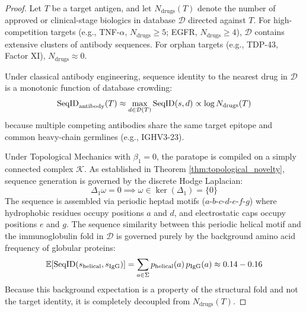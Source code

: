 \begin{proof}
Let $T$ be a target antigen, and let $N_{\text{drugs}}(T)$ denote the number of approved or clinical-stage biologics in database $\mathcal{D}$ directed against $T$. For high-competition targets (e.g., TNF-$\alpha$, $N_{\text{drugs}} \ge 5$; EGFR, $N_{\text{drugs}} \ge 4$), $\mathcal{D}$ contains extensive clusters of antibody sequences. For orphan targets (e.g., TDP-43, Factor XI), $N_{\text{drugs}} \approx 0$.

Under classical antibody engineering, sequence identity to the nearest drug in $\mathcal{D}$ is a monotonic function of database crowding:
\begin{equation}
    \operatorname{SeqID}_{\text{antibody}}(T) \approx \max_{d \in \mathcal{D}(T)} \operatorname{SeqID}(s, d) \propto \log N_{\text{drugs}}(T)
\end{equation}
because multiple competing antibodies share the same target epitope and common heavy-chain germlines (e.g., IGHV3-23).

Under Topological Mechanics with $\beta_1 = 0$, the paratope is compiled on a simply connected complex $\mathcal{K}$. As established in Theorem \ref{thm:topological_novelty}, sequence generation is governed by the discrete Hodge Laplacian:
\begin{equation}
    \Delta_1 \omega = 0 \implies \omega \in \ker(\Delta_1) = \{0\}
\end{equation}
The sequence is assembled via periodic heptad motifs ($a$-$b$-$c$-$d$-$e$-$f$-$g$) where hydrophobic residues occupy positions $a$ and $d$, and electrostatic caps occupy positions $e$ and $g$. The sequence similarity between this periodic helical motif and the immunoglobulin fold in $\mathcal{D}$ is governed purely by the background amino acid frequency of globular proteins:
\begin{equation}
\label{eq:seqid_background}
    \mathbb{E}[\operatorname{SeqID}(s_{\text{helical}}, s_{\text{IgG}})] = \sum_{a \in \Sigma} p_{\text{helical}}(a) \, p_{\text{IgG}}(a) \approx 0.14 - 0.16
\end{equation}
Because this background expectation is a property of the structural fold and not the target identity, it is completely decoupled from $N_{\text{drugs}}(T)$. 


\end{proof}
